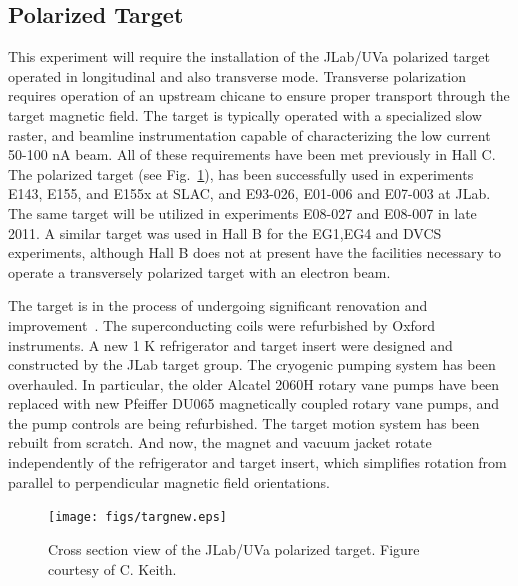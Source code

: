 \subsection{Polarized Target}
\label{POLTARGSEC}
This experiment will require the installation of the
JLab/UVa polarized target operated in longitudinal and also transverse mode.  Transverse polarization requires  operation of an upstream chicane to ensure proper transport through the target magnetic field.  The target is typically operated with a specialized slow raster, and beamline instrumentation capable of characterizing the low current 50-100 nA beam.
All of these requirements have been met previously in Hall C.
%
The polarized target (see Fig.~\ref{fig:target}), 
has been successfully used in experiments E143, E155, and E155x at SLAC, and E93-026, E01-006 and E07-003 at JLab. The same target will be utilized in experiments E08-027 and E08-007 in late 2011. 
A similar target was used in Hall B for the EG1,EG4 and DVCS experiments, although Hall B does
not at present have the facilities necessary to operate a transversely polarized target with an electron beam.

The target is in the process of undergoing significant renovation and improvement~\cite{CKEITH}.  The superconducting coils were refurbished by Oxford instruments.  A new 1 K refrigerator and target insert were designed and constructed by the JLab target group.  The cryogenic pumping system has been overhauled.  In particular, the older Alcatel 2060H rotary vane pumps have been replaced with new Pfeiffer DU065 magnetically coupled rotary vane pumps, and the pump controls are being refurbished. The target motion system has been rebuilt from scratch. And now, the magnet and vacuum jacket rotate independently of the refrigerator and target insert, which simplifies rotation from parallel to perpendicular magnetic field orientations.

%
\begin{figure}
\centering
\texttt{[image: figs/targnew.eps]} %
\caption{Cross section view of the JLab/UVa polarized target. Figure courtesy of C. Keith.  \label{fig:target}}
\end{figure}



